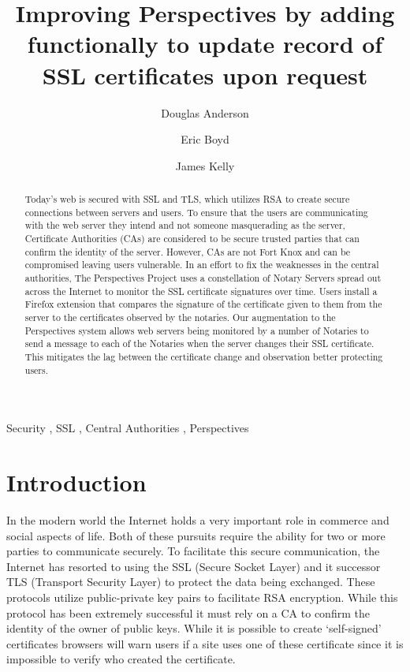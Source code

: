 \documentclass[preprint,review,12pt]{elsarticle}
\begin{document}
\begin{frontmatter}

\title{Improving Perspectives by adding functionally to update record of SSL certificates upon request}

\author[doug]{Douglas Anderson}
\author[eric]{Eric Boyd}
\author[james]{James Kelly}
\address[doug]{dander01@uoguelph.ca}
\address[eric]{boyde@uoguelph.ca}
\address[james]{kellyj@uoguelph.ca}


\begin{abstract}

Today's web is secured with SSL and TLS, which utilizes RSA to create secure
connections between servers and users. To ensure that the users are
communicating with the web server they intend and not someone masquerading as
the server, Certificate Authorities (CAs) are considered to be secure trusted
parties that can confirm the identity of the server. However, CAs are not Fort
Knox and can be compromised leaving users vulnerable. In an effort to fix the
weaknesses in the central authorities, The Perspectives Project uses a
constellation of Notary Servers spread out across the Internet to monitor the
SSL certificate signatures over time. Users install a Firefox extension that
compares the signature of the certificate given to them from the server to the
certificates observed by the notaries. Our augmentation to the Perspectives
system allows web servers being monitored by a number of Notaries to send a
message to each of the Notaries when the server changes their SSL certificate.
This mitigates the lag between the certificate change and observation better
protecting users.

\end{abstract}

\begin{keyword}
Security \sep
SSL \sep
Central Authorities \sep
Perspectives
\end{keyword}

\end{frontmatter}

\section{Introduction}
\label{intro}

In the modern world the Internet holds a very important role in commerce and
social aspects of life. Both of these pursuits require the ability for two or
more parties to communicate securely. To facilitate this secure communication,
the Internet has resorted to using the SSL (Secure Socket Layer) and it
successor TLS (Transport Security Layer) to protect the data being exchanged.
These protocols utilize public-private key pairs to facilitate RSA encryption.
While this protocol has been extremely successful it must rely on a CA to
confirm the identity of the owner of public keys. While it is possible to
create `self-signed' certificates browsers will warn users if a site uses one
of these certificate since it is impossible to verify who created the
certificate. 
\end{document}
